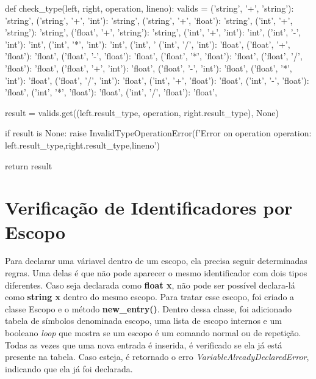 \documentclass[
	12pt,				%
	openright,			%
	twoside,			%
	a4paper,			%
	english,			%
	french,				%
	spanish,			%
	brazil				%
	]{abntex2}
\begin{document}
\begin{python}
    
def check_type(left, right, operation, lineno):
    valids = {
        ('string', '+', 'string'): 'string',
        ('string', '+', 'int'): 'string',
        ('string', '+', 'float'): 'string',
        ('int', '+', 'string'): 'string',
        ('float', '+', 'string'): 'string',
        ('int', '+', 'int'): 'int',
        ('int', '-', 'int'): 'int',
        ('int', '*', 'int'): 'int',
        ('int', '%
        ('int', '/', 'int'): 'float',
        ('float', '+', 'float'): 'float',
        ('float', '-', 'float'): 'float',
        ('float', '*', 'float'): 'float',
        ('float', '/', 'float'): 'float',
        ('float', '+', 'int'): 'float',
        ('float', '-', 'int'): 'float',
        ('float', '*', 'int'): 'float',
        ('float', '/', 'int'): 'float',
        ('int', '+', 'float'): 'float',
        ('int', '-', 'float'): 'float',
        ('int', '*', 'float'): 'float',
        ('int', '/', 'float'): 'float',
    }
 
    result = valids.get((left.result_type, operation, right.result_type), None)
 
    if result is None:
        raise InvalidTypeOperationError(f'Error on operation {operation}: {left.result_type},{right.result_type},{lineno}')
 
    return result

\end{python}
\section{Verificação de Identificadores por Escopo}
Para declarar uma váriavel dentro de um escopo, ela precisa seguir determinadas regras.
Uma delas é que não pode aparecer o mesmo
identificador com dois tipos diferentes. Caso seja declarada como \textbf{float x},
não pode ser possível declara-lá como \textbf{string x} dentro do mesmo escopo.
Para tratar esse escopo, foi criado a classe Escopo e o método \textbf{new\_entry()}.
Dentro dessa classe, foi adicionado tabela de símbolos denominada escopo, uma lista de escopo
internos e um booleano \emph{loop} que mostra se um escopo é um comando normal ou de repetição.
Todas as vezes que uma nova entrada é inserida, é verificado se ela já está presente na tabela.
Caso esteja, é retornado o
erro \emph{VariableAlreadyDeclaredError}, indicando que ela já foi declarada. 
\end{document}
